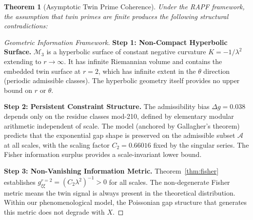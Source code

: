\documentclass[12pt]{article}
\newtheorem{theorem}{Theorem}[section]
\begin{document}
\begin{theorem}[Asymptotic Twin Prime Coherence]
Under the RAPF framework, the assumption that twin primes are finite produces
the following structural contradictions:
\end{theorem}

\begin{proof}[Geometric Information Framework]
\textbf{Step 1: Non-Compact Hyperbolic Surface.}
$\mathcal{M}_3$ is a hyperbolic surface of constant negative curvature
$K = -1/\lambda^2$ extending to $r \to \infty$. It has infinite Riemannian
volume and contains the embedded twin surface at $r=2$, which has infinite
extent in the $\theta$ direction (periodic admissible classes). The hyperbolic
geometry itself provides no upper bound on $r$ or $\theta$.

\textbf{Step 2: Persistent Constraint Structure.}
The admissibility bias $\Delta g = 0.038$ depends only on the residue classes
mod-210, defined by elementary modular arithmetic independent of scale.
The model (anchored by Gallagher's theorem) predicts that the exponential gap
shape is preserved on the admissible subset $\mathcal{A}$ at all scales, with
the scaling factor $C_2 = 0.66016$ fixed by the singular series. The Fisher
information surplus provides a scale-invariant lower bound.

\textbf{Step 3: Non-Vanishing Information Metric.}
Theorem~\ref{thm:fisher} establishes $g_{\xi\xi}^{r=2} = (C_2\lambda^2)^{-1} > 0$
for all scales. The non-degenerate Fisher metric means the twin signal is always
present in the theoretical distribution. Within our phenomenological model, the
Poissonian gap structure that generates this metric does not degrade with $X$.


\end{proof}
\end{document}
